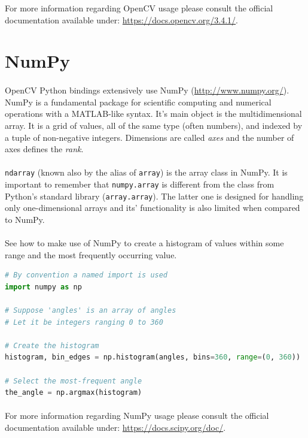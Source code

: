 For more information regarding OpenCV usage please consult the official documentation available under: \url{https://docs.opencv.org/3.4.1/}.

\section{NumPy}
\paragraph{}
OpenCV Python bindings extensively use NumPy (\url{http://www.numpy.org/}). NumPy is a fundamental package for scientific computing and numerical operations with a MATLAB-like syntax. It's main object is the multidimensional array. It is a grid of values, all of the same type (often numbers), and indexed by a tuple of non-negative integers. Dimensions are called \textit{axes} and the number of axes defines the \textit{rank}.
\paragraph{}
\texttt{ndarray} (known also by the alias of \texttt{array}) is the array class in NumPy. It is important to remember that \texttt{numpy.array} is different from the class from Python's standard library (\texttt{array.array}). The latter one is designed for handling only one-dimensional arrays and its' functionality is also limited when compared to NumPy.

\paragraph{}
See how to make use of NumPy to create a histogram of values within some range and the most frequently occurring value.

\begin{lstlisting}[language=Python, caption=Example usage of NumPy]
# By convention a named import is used
import numpy as np

# Suppose 'angles' is an array of angles
# Let it be integers ranging 0 to 360

# Create the histogram
histogram, bin_edges = np.histogram(angles, bins=360, range=(0, 360))

# Select the most-frequent angle
the_angle = np.argmax(histogram)
\end{lstlisting}

\paragraph{}
For more information regarding NumPy usage please consult the official documentation available under: \url{https://docs.scipy.org/doc/}.

